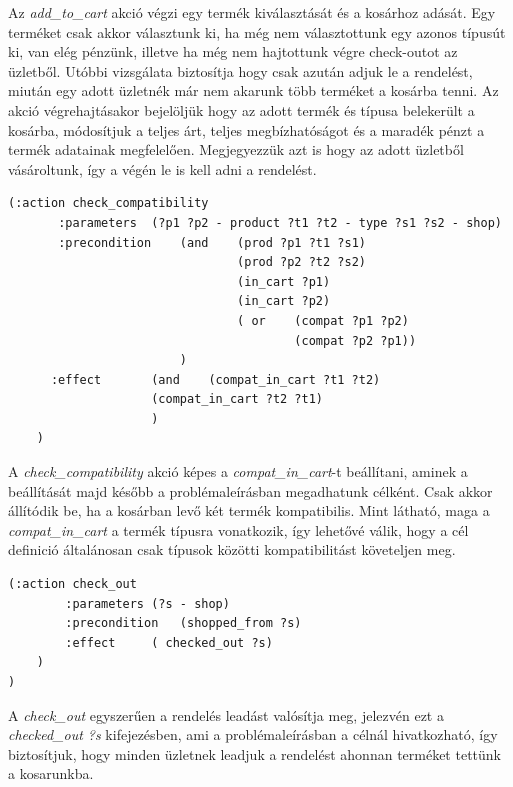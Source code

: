 Az \emph{add\_to\_cart} akció végzi egy termék kiválasztását és a kosárhoz adását. Egy terméket csak akkor választunk ki, ha még nem választottunk egy azonos típusút ki, van elég pénzünk, illetve ha még nem hajtottunk végre check-outot az üzletből. Utóbbi vizsgálata biztosítja hogy csak azután adjuk le a rendelést, miután egy adott üzletnék már nem akarunk több terméket a kosárba tenni. Az akció végrehajtásakor bejelöljük hogy az adott termék és típusa belekerült a kosárba, módosítjuk a teljes árt, teljes megbízhatóságot és a maradék pénzt a termék adatainak megfelelően. Megjegyezzük azt is hogy az adott üzletből vásároltunk, így a végén le is kell adni a rendelést.
\begin{lstlisting}[frame=single,float=!ht]	
	(:action check_compatibility
	   :parameters	(?p1 ?p2 - product ?t1 ?t2 - type ?s1 ?s2 - shop)
	   :precondition	(and 	(prod ?p1 ?t1 ?s1)
								(prod ?p2 ?t2 ?s2)
								(in_cart ?p1)
								(in_cart ?p2)
								( or	(compat ?p1 ?p2)
										(compat ?p2 ?p1))
						)
	  :effect		(and 	(compat_in_cart ?t1 ?t2)
					(compat_in_cart ?t2 ?t1)
					)
	)
\end{lstlisting}
A \emph{check\_compatibility} akció képes a \emph{compat\_in\_cart}-t beállítani, aminek a beállítását majd később a problémaleírásban megadhatunk célként. Csak akkor állítódik be, ha a kosárban levő két termék kompatibilis. Mint látható, maga a \emph{compat\_in\_cart} a termék típusra vonatkozik, így lehetővé válik, hogy a cél definició általánosan csak típusok közötti kompatibilitást követeljen meg.

\begin{lstlisting}[frame=single,float=!ht]		
	(:action check_out
		:parameters	(?s - shop)
		:precondition	(shopped_from ?s)
		:effect		( checked_out ?s)
	)
)
\end{lstlisting}
A \emph{check\_out} egyszerűen a rendelés leadást valósítja meg, jelezvén ezt a \emph{checked\_out ?s} kifejezésben, ami a problémaleírásban a célnál hivatkozható, így biztosítjuk, hogy minden üzletnek leadjuk a rendelést ahonnan terméket tettünk a kosarunkba.
